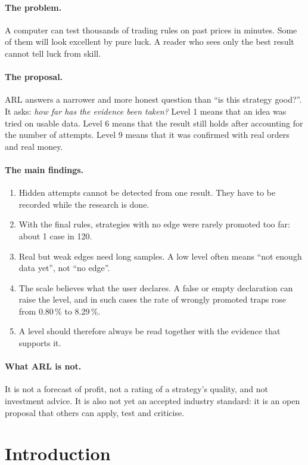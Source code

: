 \documentclass[11pt]{article}
\begin{document}
\paragraph{The problem.} A computer can test thousands of trading rules on past prices in minutes. Some of them will
look excellent by pure luck. A reader who sees only the best result cannot tell luck from skill.

\paragraph{The proposal.} ARL answers a narrower and more honest question than ``is this strategy good?''. It asks:
\emph{how far has the evidence been taken?} Level 1 means that an idea was tried on usable data. Level 6 means that the
result still holds after accounting for the number of attempts. Level 9 means that it was confirmed with real orders
and real money.

\paragraph{The main findings.}
\begin{enumerate}
\item Hidden attempts cannot be detected from one result. They have to be recorded while the research is done.
\item With the final rules, strategies with no edge were rarely promoted too far: about 1 case in 120.
\item Real but weak edges need long samples. A low level often means ``not enough data yet'', not ``no edge''.
\item The scale believes what the user declares. A false or empty declaration can raise the level, and in such cases the
rate of wrongly promoted traps rose from 0.80\,\% to 8.29\,\%.
\item A level should therefore always be read together with the evidence that supports it.
\end{enumerate}

\paragraph{What ARL is not.} It is not a forecast of profit, not a rating of a strategy's quality, and not investment
advice. It is also not yet an accepted industry standard: it is an open proposal that others can apply, test and
criticise.

\section{Introduction}
\end{document}
